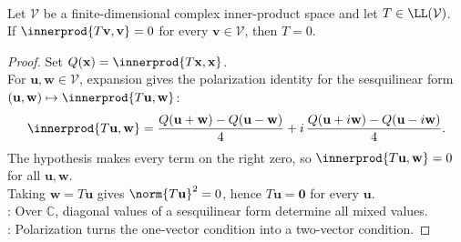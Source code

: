 \begin{lemma} \label{lem:complex-zero-quadratic-form-implies-zero-operator} \\
Let $\mathcal{V}$ be a finite-dimensional complex inner-product space and let $T\in\LL(\mathcal{V})$.\\
If $\innerprod{T\mathbf{v},\mathbf{v}}=0$ for every $\mathbf{v}\in\mathcal{V}$, then $T=0$.
\begin{proof}
Set $Q(\mathbf{x})=\innerprod{T\mathbf{x},\mathbf{x}}$.\\
For $\mathbf{u},\mathbf{w}\in\mathcal{V}$, expansion gives the polarization identity for the sesquilinear form $(\mathbf{u},\mathbf{w})\mapsto\innerprod{T\mathbf{u},\mathbf{w}}$:
\begin{align}
\innerprod{T\mathbf{u},\mathbf{w}} =\frac{Q(\mathbf{u}+\mathbf{w})-Q(\mathbf{u}-\mathbf{w})}{4} +i\,\frac{Q(\mathbf{u}+i\mathbf{w})-Q(\mathbf{u}-i\mathbf{w})}{4}. \nonumber
\end{align}
The hypothesis makes every term on the right zero, so $\innerprod{T\mathbf{u},\mathbf{w}}=0$ for all $\mathbf{u},\mathbf{w}$.\\
Taking $\mathbf{w}=T\mathbf{u}$ gives $\norm{T\mathbf{u}}^2=0$, hence $T\mathbf{u}=\mathbf{0}$ for every $\mathbf{u}$.\\
: Over $\mathbb{C}$, diagonal values of a sesquilinear form determine all mixed values.\\
: Polarization turns the one-vector condition into a two-vector condition.
\end{proof}
\end{lemma}


